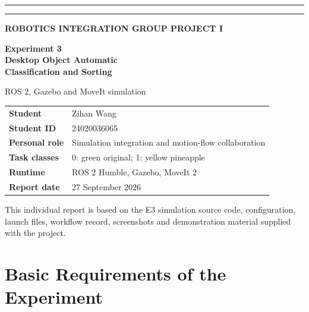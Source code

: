 \documentclass[11pt,a4paper]{article}
\begin{document}
\begin{titlepage}
\vspace*{25mm}
\noindent\colorbox{graphite}{\rule{13mm}{0pt}\rule[-155mm]{0pt}{190mm}}\hspace{3mm}%
\colorbox{warmorange}{\rule{2mm}{0pt}\rule[-155mm]{0pt}{190mm}}\hspace{8mm}%
\begin{minipage}[t]{0.72\textwidth}\raggedright
{\sffamily\color{warmorange}\bfseries\Large ROBOTICS INTEGRATION GROUP PROJECT I}\par
\vspace{7mm}
{\sffamily\bfseries\fontsize{23}{28}\selectfont\color{graphite}Experiment 3\\[2mm]Desktop Object Automatic\\Classification and Sorting}\par
\vspace{5mm}
{\sffamily\Large\color{graphite}ROS 2, Gazebo and MoveIt simulation}\par

\vspace{18mm}
\colorbox{sand}{\parbox{0.92\linewidth}{\vspace{5mm}\begin{tabular}{@{}>{\sffamily\bfseries}p{33mm}p{67mm}@{}}
Student & Zihan Wang \\
Student ID & 24020036065 \\
Personal role & Simulation integration and motion-flow collaboration \\
Task classes & 0: green original; 1: yellow pineapple \\
Runtime & ROS 2 Humble, Gazebo, MoveIt 2 \\
Report date & 27 September 2026 \\
\end{tabular}\vspace{5mm}}}

\vfill
{\sffamily\small\color{graphite}This individual report is based on the E3 simulation source code, configuration, launch files, workflow record, screenshots and demonstration material supplied with the project.}
\end{minipage}
\end{titlepage}

\tableofcontents
\clearpage

\section{Basic Requirements of the Experiment}
\end{document}
